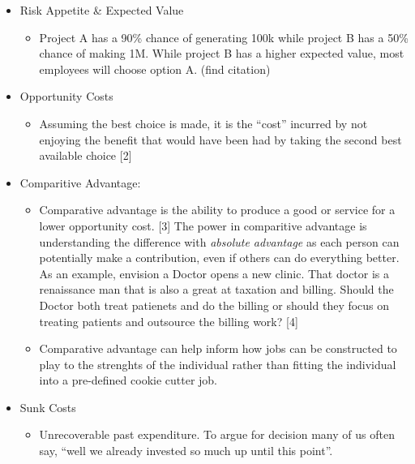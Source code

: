 \documentclass[
  letterpaper,
  DIV=11,
  numbers=noendperiod]{scrreprt}
\providecommand{\tightlist}{%
  \setlength{\itemsep}{0pt}\setlength{\parskip}{0pt}}\usepackage{longtable,booktabs,array}
\begin{document}
\begin{itemize}
\tightlist
\item
  Risk Appetite \& Expected Value

  \begin{itemize}
  \tightlist
  \item
    Project A has a 90\% chance of generating 100k while project B has a
    50\% chance of making 1M. While project B has a higher expected
    value, most employees will choose option A. (find citation)
  \end{itemize}
\item
  Opportunity Costs

  \begin{itemize}
  \tightlist
  \item
    Assuming the best choice is made, it is the ``cost'' incurred by not
    enjoying the benefit that would have been had by taking the second
    best available choice {[}2{]}
  \end{itemize}
\item
  Comparitive Advantage:

  \begin{itemize}
  \tightlist
  \item
    Comparative advantage is the ability to produce a good or service
    for a lower opportunity cost. {[}3{]} The power in comparitive
    advantage is understanding the difference with \emph{absolute
    advantage} as each person can potentially make a contribution, even
    if others can do everything better. As an example, envision a Doctor
    opens a new clinic. That doctor is a renaissance man that is also a
    great at taxation and billing. Should the Doctor both treat
    patienets and do the billing or should they focus on treating
    patients and outsource the billing work? {[}4{]}
  \item
    Comparative advantage can help inform how jobs can be constructed to
    play to the strenghts of the individual rather than fitting the
    individual into a pre-defined cookie cutter job.
  \end{itemize}
\item
  Sunk Costs

  \begin{itemize}
  \tightlist
  \item
    Unrecoverable past expenditure. To argue for decision many of us
    often say, ``well we already invested so much up until this point''.
  \end{itemize}
\end{itemize}
\end{document}
